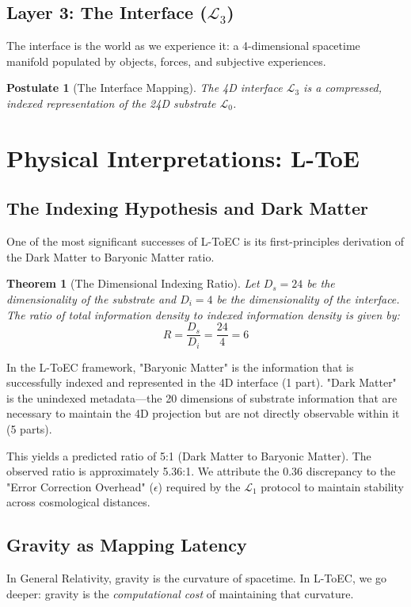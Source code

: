 \documentclass[11pt,onecolumn]{article}
\newcommand{\substrate}{\mathcal{L}_0}
\newcommand{\protocol}{\mathcal{L}_1}
\newcommand{\interface}{\mathcal{L}_3}
\newtheorem{theorem}{Theorem}
\newtheorem{postulate}{Postulate}
\begin{document}
\subsection{Layer 3: The Interface ($\interface$)}
The interface is the world as we experience it: a 4-dimensional spacetime manifold populated by objects, forces, and subjective experiences. 
\begin{postulate}[The Interface Mapping]
The 4D interface $\interface$ is a compressed, indexed representation of the 24D substrate $\substrate$.
\end{postulate}

\section{Physical Interpretations: L-ToE}

\subsection{The Indexing Hypothesis and Dark Matter}
One of the most significant successes of L-ToEC is its first-principles derivation of the Dark Matter to Baryonic Matter ratio.

\begin{theorem}[The Dimensional Indexing Ratio]
Let $D_s = 24$ be the dimensionality of the substrate and $D_i = 4$ be the dimensionality of the interface. The ratio of total information density to indexed information density is given by:
\begin{equation}
R = \frac{D_s}{D_i} = \frac{24}{4} = 6
\end{equation}
\end{theorem}

In the L-ToEC framework, "Baryonic Matter" is the information that is successfully indexed and represented in the 4D interface (1 part). "Dark Matter" is the unindexed metadata—the 20 dimensions of substrate information that are necessary to maintain the 4D projection but are not directly observable within it (5 parts).

This yields a predicted ratio of 5:1 (Dark Matter to Baryonic Matter). The observed ratio is approximately 5.36:1. We attribute the 0.36 discrepancy to the "Error Correction Overhead" ($\epsilon$) required by the $\protocol$ protocol to maintain stability across cosmological distances.

\subsection{Gravity as Mapping Latency}
In General Relativity, gravity is the curvature of spacetime. In L-ToEC, we go deeper: gravity is the \textit{computational cost} of maintaining that curvature.
\end{document}
